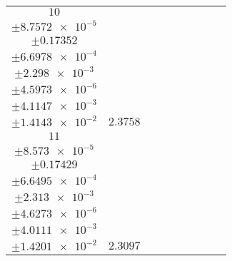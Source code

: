 \documentclass[8pt]{article}
\begin{document}
\begin{longtable}[l]{c c c c c c c c c}
$\num{10}$ & \begin{tabular}[c]{@{}c@{}}$\num{2.9871e-2}$ \\ $\pm\num{8.7572e-5}$\end{tabular} & \begin{tabular}[c]{@{}c@{}}$\num{0.21419}$ \\ $\pm\num{0.17352}$\end{tabular} & \begin{tabular}[c]{@{}c@{}}$\num{-1.9904}$ \\ $\pm\num{6.6978e-4}$\end{tabular} & \begin{tabular}[c]{@{}c@{}}$\num{1.4364e+3}$ \\ $\pm\num{2.298e-3}$\end{tabular} & \begin{tabular}[c]{@{}c@{}}$\num{2.8737}$ \\ $\pm\num{4.5973e-6}$\end{tabular} & \begin{tabular}[c]{@{}c@{}}$\num{1.1598}$ \\ $\pm\num{4.1147e-3}$\end{tabular} & \begin{tabular}[c]{@{}c@{}}$\num{4.1878}$ \\ $\pm\num{1.4143e-2}$\end{tabular} & $\num{2.3758}$\\
$\num{11}$ & \begin{tabular}[c]{@{}c@{}}$\num{2.9039e-2}$ \\ $\pm\num{8.573e-5}$\end{tabular} & \begin{tabular}[c]{@{}c@{}}$\num{0.31415}$ \\ $\pm\num{0.17429}$\end{tabular} & \begin{tabular}[c]{@{}c@{}}$\num{1.9886}$ \\ $\pm\num{6.6495e-4}$\end{tabular} & \begin{tabular}[c]{@{}c@{}}$\num{1.4404e+3}$ \\ $\pm\num{2.313e-3}$\end{tabular} & \begin{tabular}[c]{@{}c@{}}$\num{2.8816}$ \\ $\pm\num{4.6273e-6}$\end{tabular} & \begin{tabular}[c]{@{}c@{}}$\num{1.1235}$ \\ $\pm\num{4.0111e-3}$\end{tabular} & \begin{tabular}[c]{@{}c@{}}$\num{4.1723}$ \\ $\pm\num{1.4201e-2}$\end{tabular} & $\num{2.3097}$\\

\end{longtable}
\end{document}
